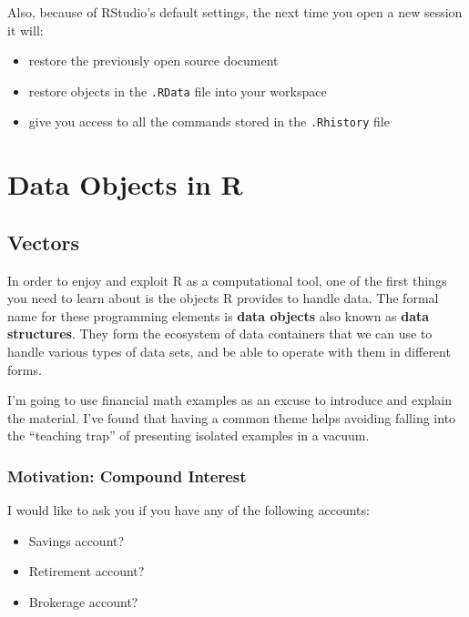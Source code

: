\documentclass[
]{book}
\begin{document}
Also, because of RStudio's default settings, the next time you open a new
session it will:

\begin{itemize}
\item
  restore the previously open source document
\item
  restore objects in the \texttt{.RData} file into your workspace
\item
  give you access to all the commands stored in the \texttt{.Rhistory} file
\end{itemize}

\hypertarget{part-data-objects-in-r}{%
\part{Data Objects in R}\label{part-data-objects-in-r}}

\hypertarget{vectors}{%
\chapter{Vectors}\label{vectors}}

In order to enjoy and exploit R as a computational tool, one of the first
things you need to learn about is the objects R provides to handle data.
The formal name for these programming elements is \textbf{data objects} also known as
\textbf{data structures}. They form the ecosystem of data containers that we can use
to handle various types of data sets, and be able to operate with them in
different forms.

I'm going to use financial math examples as an excuse to introduce and explain
the material. I've found that having a common theme helps avoiding falling
into the ``teaching trap'' of presenting isolated examples in a vacuum.

\hypertarget{motivation-compound-interest}{%
\section{Motivation: Compound Interest}\label{motivation-compound-interest}}

I would like to ask you if you have any of the following accounts:

\begin{itemize}
\item
  Savings account?
\item
  Retirement account?
\item
  Brokerage account?
\end{itemize}
\end{document}
